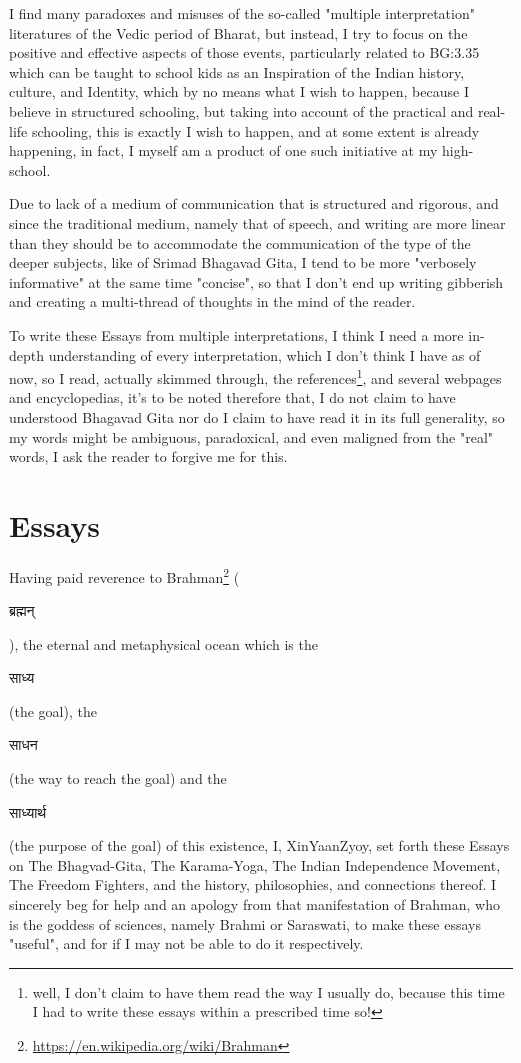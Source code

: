 \documentclass[a4paper]{article}
\begin{document}
I find many paradoxes and misuses of the so-called "multiple interpretation" literatures of the Vedic period of Bharat, 
but instead, I try to focus on the positive and effective aspects of those events, particularly related to BG:3.35 which 
can be taught to school kids as an Inspiration of the Indian history, culture, and Identity, which by no means what I wish to happen, 
because I believe in structured schooling, but taking into account of the practical and real-life schooling, this is exactly 
I wish to happen, and at some extent is already happening, in fact, I myself am a product of one such initiative at my high-school.

Due to lack of a medium of communication that is structured and rigorous, and since the traditional medium, namely that of 
speech, and writing are more linear than they should be to accommodate the communication of the type of the deeper 
subjects, like of Srimad Bhagavad Gita, I tend to be more "verbosely informative" at the same time "concise", so that I don't end 
up writing gibberish and creating a multi-thread of thoughts in the mind of the reader.

To write these Essays from multiple interpretations, I think I need a more in-depth understanding of every interpretation, 
which I don't think I have as of now, so I read, actually skimmed through, the references\footnote{well, I don't claim to have 
them read the way I usually do, because this time I had to write these essays within a prescribed time so!}, and several 
webpages and encyclopedias, it's to be noted therefore that, I do not claim to have understood Bhagavad Gita nor do I claim to have read 
it in its full generality, so my words might be ambiguous, paradoxical, and even maligned from the "real" words, I ask the reader 
to forgive me for this.

\newpage

\section{Essays}
Having paid reverence to Brahman\footnote{\href{https://en.wikipedia.org/wiki/Brahman}{https://en.wikipedia.org/wiki/Brahman}} 
(\begin{sanskrit}ब्रह्मन्\end{sanskrit}), the eternal and metaphysical ocean which is the \begin{sanskrit}साध्य\end{sanskrit}(the goal), 
the \begin{sanskrit}साधन\end{sanskrit}(the way to reach the goal) and the \begin{sanskrit}साध्यार्थ\end{sanskrit}(the purpose of the goal) of 
this existence, I, XinYaanZyoy, set forth these Essays on The Bhagvad-Gita, The Karama-Yoga, The Indian Independence Movement, 
The Freedom Fighters, and the history, philosophies, and connections thereof. I sincerely beg for help and an apology from that 
manifestation of Brahman, who is the goddess of sciences, namely Brahmi or Saraswati, to make these essays "useful", and for if I 
may not be able to do it respectively.
\end{document}
